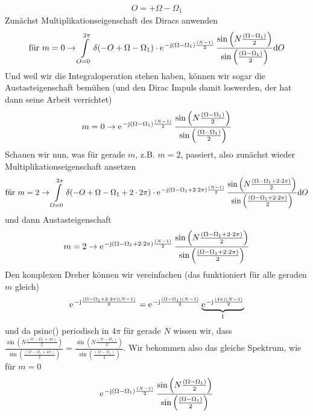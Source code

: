 \begin{ExCalc}
\begin{align}
O=+\Omega-\Omega_1
\end{align}
Zunächst Multiplikationseigenschaft des Diracs anwenden
\begin{align}
\text{für   }m=0\rightarrow
\int\limits_{O=0}^{2\pi}
\delta(-O+\Omega-\Omega_1)
\cdot
\e^{-\im(\Omega-\Omega_1)\frac{(N-1)}{2}}\,
\frac{\sin\left(N\frac{(\Omega-\Omega_1)}{2}\right)}{\sin\left(\frac{(\Omega-\Omega_1)}{2}\right)}\fsd O
\end{align}
Und weil wir die Integraloperation stehen haben, können wir sogar die
Austasteigenschaft bemühen (und den Dirac Impuls damit loswerden, der hat dann seine Arbeit verrichtet)
\begin{align}
m=0\rightarrow
\e^{-\im(\Omega-\Omega_1)\frac{(N-1)}{2}}\,
\frac{\sin\left(N\frac{(\Omega-\Omega_1)}{2}\right)}{\sin\left(\frac{(\Omega-\Omega_1)}{2}\right)}
\end{align}
%
Schauen wir nun, was für gerade $m$, z.B. $m=2$, passiert, also zunächst wieder Multiplikationseigenschaft
ansetzen
\begin{align}
\text{für   }m=2\rightarrow
\int\limits_{O=0}^{2\pi}
\delta(-O+\Omega-\Omega_1+2 \cdot 2\pi)
\cdot
\e^{-\im(\Omega-\Omega_1 +2 \cdot  2\pi)\frac{(N-1)}{2}}\,
\frac{\sin\left(N\frac{(\Omega-\Omega_1 + 2 \cdot 2\pi)}{2}\right)}{\sin\left(\frac{(\Omega-\Omega_1 + 2 \cdot 2\pi)}{2}\right)}\fsd O
\end{align}
und dann Austasteigenschaft
\begin{align}
m=2\rightarrow
\e^{-\im(\Omega-\Omega_1 +2 \cdot  2\pi)\frac{(N-1)}{2}}\,
\frac{\sin\left(N\frac{(\Omega-\Omega_1 + 2 \cdot 2\pi)}{2}\right)}{\sin\left(\frac{(\Omega-\Omega_1 + 2 \cdot 2\pi)}{2}\right)}
\end{align}
%
Den komplexen Dreher können wir vereinfachen (das funktioniert für alle geraden $m$ gleich)
\begin{align}
\e^{-\im\frac{(\Omega-\Omega_1 + 2 \cdot 2\pi)(N-1)}{2}} =
\e^{-\im\frac{(\Omega-\Omega_1)(N-1)}{2}}
\underbrace{\e^{-\im\frac{(4\pi)(N-1)}{2}}}_{1}
\end{align}
und da psinc() periodisch in $4\pi$ für gerade $N$ wissen wir, dass
$\frac{\sin\left(N\frac{(\Omega-\Omega_1 + 4\pi)}{2}\right)}{\sin\left(\frac{(\Omega-\Omega_1 + 4\pi)}{2}\right)} = \frac{\sin\left(N\frac{(\Omega-\Omega_1)}{2}\right)}{\sin\left(\frac{(\Omega-\Omega_1)}{2}\right)}$.
Wir bekommen also das gleiche Spektrum, wie für $m=0$
\begin{align}
\e^{-\im (\Omega-\Omega_1) \frac{(N-1)}{2}}\,
\frac{\sin\left(N\frac{(\Omega-\Omega_1)}{2}\right)}{\sin\left(\frac{(\Omega-\Omega_1)}{2}\right)}

\end{align}
\end{ExCalc}
